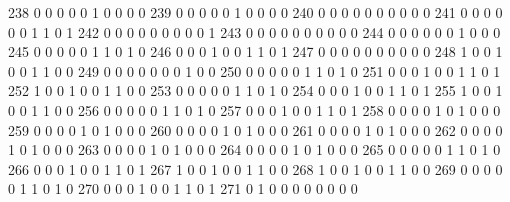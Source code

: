 \documentclass[compress,8pt]{beamer}
\begin{document}
\begin{frame}
\begin{Schunk}
  238      0       0   0              0        0    1       0       0   0   0
  239      0       0   0              0        0    1       0       0   0   0
  240      0       0   0              0        0    0       0       0   0   0
  241      0       0   0              0        0    0       1       1   0   1
  242      0       0   0              0        0    0       0       0   0   1
  243      0       0   0              0        0    0       0       0   0   0
  244      0       0   0              0        0    0       1       0   0   0
  245      0       0   0              0        0    1       1       0   1   0
  246      0       0   0              1        0    0       1       1   0   1
  247      0       0   0              0        0    0       0       0   0   0
  248      1       0   0              1        0    0       1       1   0   0
  249      0       0   0              0        0    0       0       1   0   0
  250      0       0   0              0        0    1       1       0   1   0
  251      0       0   0              1        0    0       1       1   0   1
  252      1       0   0              1        0    0       1       1   0   0
  253      0       0   0              0        0    1       1       0   1   0
  254      0       0   0              1        0    0       1       1   0   1
  255      1       0   0              1        0    0       1       1   0   0
  256      0       0   0              0        0    1       1       0   1   0
  257      0       0   0              1        0    0       1       1   0   1
  258      0       0   0              0        1    0       1       0   0   0
  259      0       0   0              0        1    0       1       0   0   0
  260      0       0   0              0        1    0       1       0   0   0
  261      0       0   0              0        1    0       1       0   0   0
  262      0       0   0              0        1    0       1       0   0   0
  263      0       0   0              0        1    0       1       0   0   0
  264      0       0   0              0        1    0       1       0   0   0
  265      0       0   0              0        0    1       1       0   1   0
  266      0       0   0              1        0    0       1       1   0   1
  267      1       0   0              1        0    0       1       1   0   0
  268      1       0   0              1        0    0       1       1   0   0
  269      0       0   0              0        0    1       1       0   1   0
  270      0       0   0              1        0    0       1       1   0   1
  271      0       1   0              0        0    0       0       0   0   0

\end{Schunk}
\end{frame}
\end{document}
